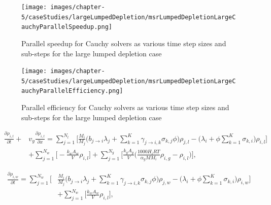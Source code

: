 \clearpage

\begin{figure}[p]
    \centering
    \texttt{[image: images/chapter-5/caseStudies/largeLumpedDepletion/msrLumpedDepletionLargeCauchyParallelSpeedup.png]}
    \caption{Parallel speedup for Cauchy solvers as various time step sizes and sub-steps for the large lumped depletion case}
    \label{fig:large_lumped_depletion_cauchy_speedup}
\end{figure}

\clearpage

\begin{figure}[p]
    \centering
    \texttt{[image: images/chapter-5/caseStudies/largeLumpedDepletion/msrLumpedDepletionLargeCauchyParallelEfficiency.png]}
    \caption{Parallel efficiency for Cauchy solvers as various time step sizes and sub-steps for the large lumped depletion case}
    \label{fig:large_lumped_depletion_cauchy_parallel_eff}
\end{figure}

\clearpage

\begin{equation}
\begin{split}
    \frac{\partial \rho_{i,l}}{\partial t} + &v_{y}\frac{\partial \rho_{i,l}}{\partial x}
    = 
    \sum_{j=1}^{N_{l}}\bigg[\frac{M_{i}}{M_{j}}\bigg(b_{j\rightarrow i}\lambda_{j} + 
    \sum_{k=1}^{K}\gamma_{j\rightarrow i,k}\sigma_{k,j}\phi \bigg)\rho_{j, l}
   - \bigg(\lambda_{i} + \phi\sum_{k=1}^{K} \sigma_{k,i}\bigg)\rho_{i, l} \bigg]\\& + \sum_{j=1}^{N_{w}} \bigg[-\frac{k_{w}A_{w}}{V}\rho_{i,l} \bigg] + \sum_{j=1}^{N_{g}} \bigg[  \frac{k_{g}A_{g}}{V}\bigg(\frac{1000H_{i}RT}{\alpha_{g}MM_{i}}\rho_{i, g} - \rho_{i,l}\bigg) \bigg],
    \label{eq:MSR2DDepletionSmallLiquidPhase}
\end{split}
\end{equation}

\begin{equation}
\begin{split}
    \frac{\partial \rho_{i,w}}{\partial t} = \sum_{j=1}^{N_{w}}\bigg[&\frac{M_{i}}{M_{j}}\bigg(b_{j\rightarrow i}\lambda_{j} + 
    \sum_{k=1}^{K}\gamma_{j\rightarrow i,k}\sigma_{k,j}\phi \bigg)\rho_{j, w}
    - \bigg(\lambda_{i} + \phi\sum_{k=1}^{K} \sigma_{k,i}\bigg)\rho_{i, w} \bigg]\\ &+ \sum_{j=1}^{N_{w}} \bigg[\frac{k_{w}A_{w}}{V}\rho_{i,l} \bigg],
    \label{eq:MSR2DDepletionSmallWallPhase}
\end{split}
\end{equation}


